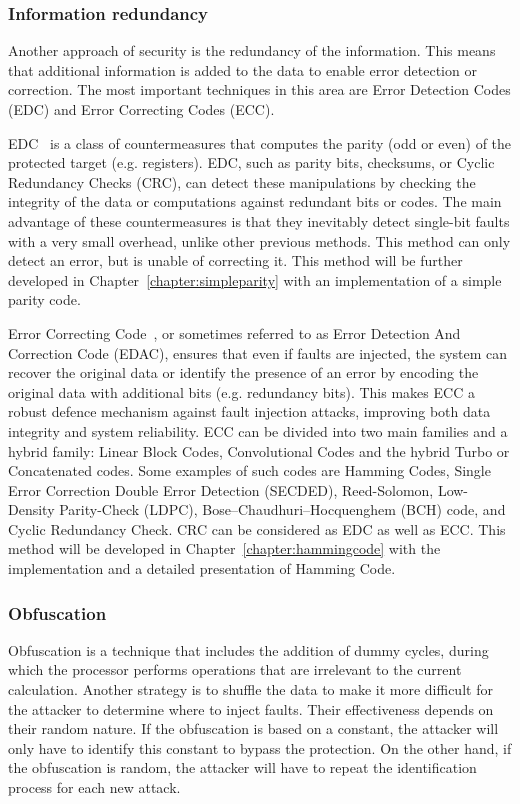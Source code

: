 \subsubsection{Information redundancy}
Another approach of security is the redundancy of the information. This means that additional information is added to the data to enable error detection or correction. The most important techniques in this area are Error Detection Codes (EDC) and Error Correcting Codes (ECC).

EDC~\cite{APHBML-16-date,MKBM-14-sta,BBKMP-03-toc} is a class of countermeasures that computes the parity (odd or even) of the protected target (e.g. registers). EDC, such as parity bits, checksums, or Cyclic Redundancy Checks (CRC), can detect these manipulations by checking the integrity of the data or computations against redundant bits or codes. The main advantage of these countermeasures is that they inevitably detect single-bit faults with a very small overhead, unlike other previous methods. This method can only detect an error, but is unable of correcting it. This method will be further developed in Chapter~\ref{chapter:simpleparity} with an implementation of a simple parity code.

Error Correcting Code~\cite{PTCVAJ-20-iscas,DGMMNM-20-arcs,CB-06-toc}, or sometimes referred to as Error Detection And Correction Code (EDAC), ensures that even if faults are injected, the system can recover the original data or identify the presence of an error by encoding the original data with additional bits (e.g. redundancy bits). This makes ECC a robust defence mechanism against fault injection attacks, improving both data integrity and system reliability. ECC can be divided into two main families and a hybrid family: Linear Block Codes, Convolutional Codes and the hybrid Turbo or Concatenated codes. Some examples of such codes are Hamming Codes, Single Error Correction Double Error Detection (SECDED), Reed-Solomon, Low-Density Parity-Check (LDPC), Bose–Chaudhuri–Hocquenghem (BCH) code, and Cyclic Redundancy Check. CRC can be considered as EDC as well as ECC. This method will be developed in Chapter~\ref{chapter:hammingcode} with the implementation and a detailed presentation of Hamming Code.

\subsubsection{Obfuscation}
Obfuscation is a technique that includes the addition of dummy cycles, during which the processor performs operations that are irrelevant to the current calculation. Another strategy is to shuffle the data to make it more difficult for the attacker to determine where to inject faults. Their effectiveness depends on their random nature. If the obfuscation is based on a constant, the attacker will only have to identify this constant to bypass the protection. On the other hand, if the obfuscation is random, the attacker will have to repeat the identification process for each new attack.

